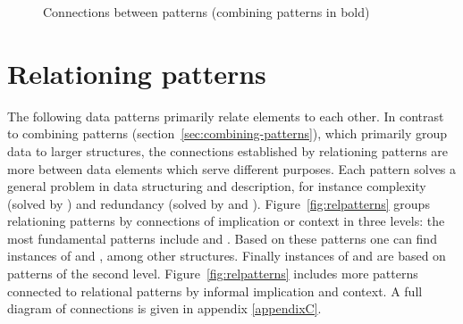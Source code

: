 \vfill
\begin{figure}[h]
\centering
{}
\caption{Connections between patterns (combining patterns in bold)}
\label{fig:compatterns}
\end{figure}
\vfill


\clearpage


\clearpage
\section{Relationing patterns}
\label{sec:relationing-patterns} 

The following data patterns primarily relate elements to each other. In
contrast to combining patterns (section~\ref{sec:combining-patterns}), which
primarily group data to larger structures, the connections established by
relationing patterns are more between data elements which serve different
purposes. Each pattern solves a general problem in data structuring and
description, for instance complexity (solved by ) and
redundancy (solved by  and ).
Figure~\ref{fig:relpatterns} groups relationing patterns by connections of
implication or context in three levels: the most fundamental patterns include
 and . Based on these patterns one can
find instances of  and , among other
structures. Finally instances of  and 
are based on patterns of the second level. Figure~\ref{fig:relpatterns}
includes more patterns connected to relational patterns by informal implication
and context. A full diagram of connections is given in appendix
\ref{appendixC}.

